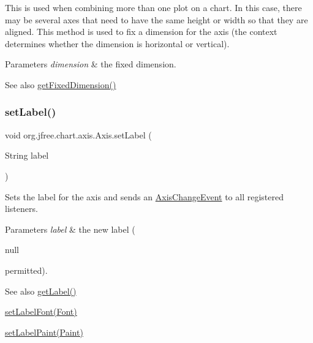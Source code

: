 This is used when combining more than one plot on a chart. In this case, there may be several axes that need to have the same height or width so that they are aligned. This method is used to fix a dimension for the axis (the context determines whether the dimension is horizontal or vertical).


\begin{DoxyParams}{Parameters}
{\em dimension} & the fixed dimension.\\
\hline
\end{DoxyParams}
\begin{DoxySeeAlso}{See also}
\mbox{\hyperlink{classorg_1_1jfree_1_1chart_1_1axis_1_1_axis_ae89f36379d8e1a4cd95fe6acc39de039}{get\+Fixed\+Dimension()}} 
\end{DoxySeeAlso}
\mbox{\label{classorg_1_1jfree_1_1chart_1_1axis_1_1_axis_a645aa69b1907aa460a92e08a126c6d79}} 
\subsubsection{\texorpdfstring{set\+Label()}{setLabel()}}
{\footnotesize\ttfamily void org.\+jfree.\+chart.\+axis.\+Axis.\+set\+Label (\begin{DoxyParamCaption}\item[{String}]{label }\end{DoxyParamCaption})}

Sets the label for the axis and sends an \mbox{\hyperlink{}{Axis\+Change\+Event}} to all registered listeners.


\begin{DoxyParams}{Parameters}
{\em label} & the new label (
\begin{DoxyCode}
null 
\end{DoxyCode}
 permitted).\\
\hline
\end{DoxyParams}
\begin{DoxySeeAlso}{See also}
\mbox{\hyperlink{classorg_1_1jfree_1_1chart_1_1axis_1_1_axis_ab3cbe2900ef95b51b4036f7b753e3c41}{get\+Label()}} 

\mbox{\hyperlink{classorg_1_1jfree_1_1chart_1_1axis_1_1_axis_a9fe56f9cd8d81dc5a0b96b70ab0c8643}{set\+Label\+Font(\+Font)}} 

\mbox{\hyperlink{classorg_1_1jfree_1_1chart_1_1axis_1_1_axis_a68eeb531bf1f73ff8b0d4aa12ed54a1a}{set\+Label\+Paint(\+Paint)}} 
\end{DoxySeeAlso}
\mbox{\label{classorg_1_1jfree_1_1chart_1_1axis_1_1_axis_a5f748a1d2aabe0b3f72120fbd7c9d28c}} 
